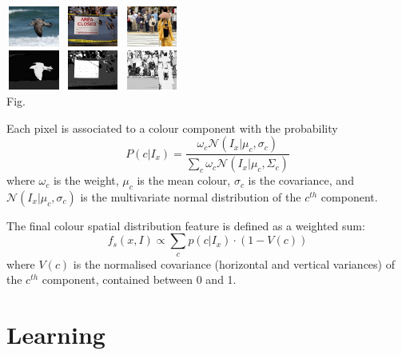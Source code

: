 \documentclass[10pt,twocolumn,letterpaper]{article}
\newcommand{\SUM}{\sum\limits}
\begin{document}
    \begin{center}
    \includegraphics[width=0.72in,height=0.52in]{./CSD_image/1.jpg}
    \includegraphics[width=0.72in,height=0.52in]{./CSD_image/2.jpg}
    \includegraphics[width=0.72in,height=0.52in]{./CSD_image/3.jpg}\\
    \includegraphics[width=0.72in,height=0.52in]{./CSD_image/1_CSD.jpg}
    \includegraphics[width=0.72in,height=0.52in]{./CSD_image/2_CSD.jpg}
    \includegraphics[width=0.72in,height=0.52in]{./CSD_image/3_CSD.jpg} \\
    \footnotesize Fig. 
    \end{center}

    Each pixel is associated to a colour component with the probability
    $$
    P(c|I_x) = \frac{\omega_c\mathcal{N}(I_x|\mu_c,\sigma_c)}{\SUM_c \omega_c \mathcal{N}(I_x|\mu_c,\Sigma_c)}
    $$
    where $\omega_c$ is the weight, $\mu_c$ is the mean colour, $\sigma_c$ is the covariance, and $\mathcal N(I_x|\mu_c,\sigma_c)$ is the multivariate normal distribution of the $c^{th}$ component.

    The final colour spatial distribution feature is defined as a weighted sum:
    $$
    f_s(x,I)\propto\SUM_c p(c|I_x)\cdot(1-V(c))
    $$
    where $V(c)$ is the normalised covariance (horizontal and vertical variances) of the $c^{th}$ component, contained between 0 and 1.
\section{Learning}
\end{document}
